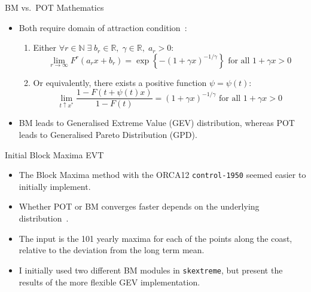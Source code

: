 \begin{frame}{BM vs.\ POT Mathematics}
\begin{itemize}
  \item Both require domain of attraction condition~\cite{bucher2018horse}:

  \begin{enumerate}
    \item Either $\forall r \in \mathbb{N} \;\exists \;b_r \in \mathbb{R},\; \gamma\in \mathbb{R},\; a_r>0: $
      \begin{equation}
      \lim _{r \rightarrow \infty} F^{r}\left(a_{r} x+b_{r}\right)=\exp \left\{-(1+\gamma x)^{-1 / \gamma}\right\} \text { for all } 1+\gamma x>0
      \tag{BM}
      \end{equation}

    \item Or equivalently, there exists a positive function $\psi=\psi (t):$
      \begin{equation}
      \lim _{t \uparrow x^{*}} \frac{1-F(t+\psi(t) x)}{1-F(t)}=(1+\gamma x)^{-1 / \gamma} \text { for all } 1+\gamma x>0
      \tag{POT}
      \end{equation}
   \end{enumerate}

   \item BM leads to Generalised Extreme Value (GEV) distribution,
         whereas POT leads to Generalised Pareto Distribution (GPD).

\end{itemize}
\end{frame}

\begin{frame}{Initial Block Maxima EVT }
  \begin{itemize}
    \item The Block Maxima method with the ORCA12
    \texttt{control-1950} seemed easier to initially implement.
    \item Whether POT or BM converges faster depends
          on the underlying distribution~\cite{bucher2018horse}.
    \item The input is the 101 yearly maxima for each of the points along the coast,
         relative to the deviation from the long term mean.
    \item I initially used two different BM modules in \texttt{skextreme}, but present the
          results of the more flexible GEV implementation.
  \end{itemize}
\end{frame}



